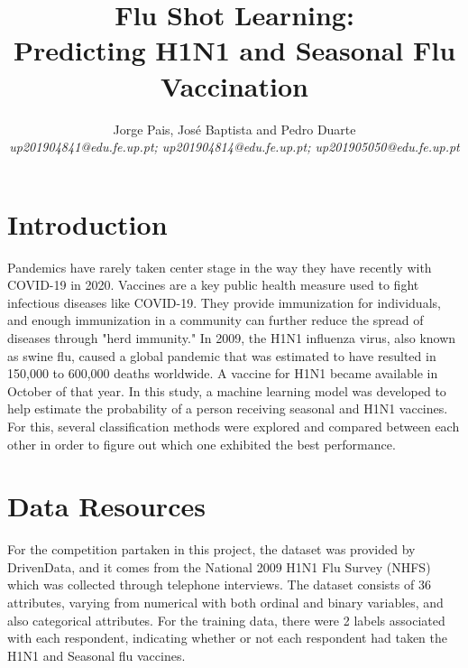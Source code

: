 \documentclass{IEEEtran}
\begin{document}
\title{Flu Shot Learning: \\Predicting H1N1 and Seasonal Flu Vaccination}
\author{Jorge Pais, José Baptista and Pedro Duarte\\ 
    \textit{up201904841@edu.fe.up.pt; up201904814@edu.fe.up.pt; up201905050@edu.fe.up.pt}}

\maketitle

\begin{abstract}
\end{abstract}

\section{Introduction}
Pandemics have rarely taken center stage in the way they have recently with COVID-19 in 2020.  Vaccines are a key public health measure used to fight infectious diseases like COVID-19. They provide immunization for individuals, and enough immunization in a community can further reduce the spread of diseases through "herd immunity." 
In 2009, the H1N1 influenza virus, also known as swine flu, caused a global pandemic that was estimated to have resulted in 150,000 to 600,000 deaths worldwide. A vaccine for H1N1 became available in October of that year. In this study, a machine learning model was developed to help estimate the probability of a person receiving seasonal and H1N1 vaccines. For this, several classification methods were explored and compared between each other in order to figure out which one exhibited the best performance.

\section{Data Resources}

For the competition partaken in this project, the dataset was provided by DrivenData, and it comes from the National 2009 H1N1 Flu Survey (NHFS) which was collected through telephone interviews. The dataset consists of 36 attributes, varying from numerical with both ordinal and binary variables, and also categorical attributes. For the training data, there were 2 labels associated with each respondent, indicating whether or not each respondent had taken the H1N1 and Seasonal flu vaccines.
\end{document}
